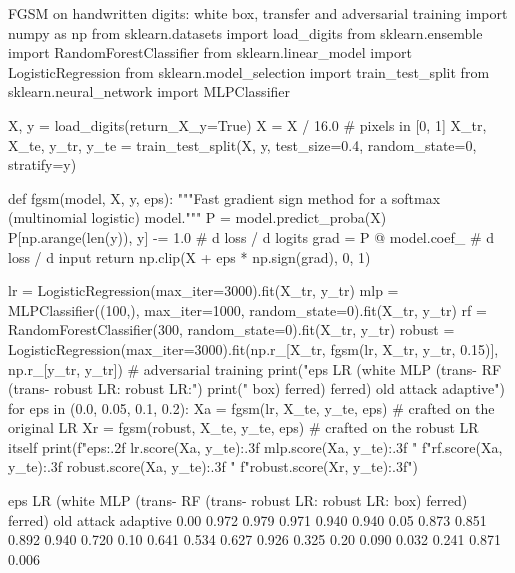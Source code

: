 \begin{pylisting}[label={lst:fgsm}]{FGSM on handwritten digits: white box, transfer and adversarial training}
import numpy as np
from sklearn.datasets import load_digits
from sklearn.ensemble import RandomForestClassifier
from sklearn.linear_model import LogisticRegression
from sklearn.model_selection import train_test_split
from sklearn.neural_network import MLPClassifier

X, y = load_digits(return_X_y=True)
X = X / 16.0                                                    # pixels in [0, 1]
X_tr, X_te, y_tr, y_te = train_test_split(X, y, test_size=0.4, random_state=0, stratify=y)

def fgsm(model, X, y, eps):
    """Fast gradient sign method for a softmax (multinomial logistic) model."""
    P = model.predict_proba(X)
    P[np.arange(len(y)), y] -= 1.0                              # d loss / d logits
    grad = P @ model.coef_                                       # d loss / d input
    return np.clip(X + eps * np.sign(grad), 0, 1)

lr = LogisticRegression(max_iter=3000).fit(X_tr, y_tr)
mlp = MLPClassifier((100,), max_iter=1000, random_state=0).fit(X_tr, y_tr)
rf = RandomForestClassifier(300, random_state=0).fit(X_tr, y_tr)
robust = LogisticRegression(max_iter=3000).fit(np.r_[X_tr, fgsm(lr, X_tr, y_tr, 0.15)],
                                               np.r_[y_tr, y_tr])    # adversarial training
print("eps   LR (white  MLP (trans-  RF (trans-  robust LR:   robust LR:")
print("      box)       ferred)      ferred)     old attack   adaptive")
for eps in (0.0, 0.05, 0.1, 0.2):
    Xa = fgsm(lr, X_te, y_te, eps)                   # crafted on the original LR
    Xr = fgsm(robust, X_te, y_te, eps)               # crafted on the robust LR itself
    print(f"{eps:.2f}  {lr.score(Xa, y_te):.3f}      {mlp.score(Xa, y_te):.3f}        "
          f"{rf.score(Xa, y_te):.3f}       {robust.score(Xa, y_te):.3f}        "
          f"{robust.score(Xr, y_te):.3f}")
\end{pylisting}
\begin{pyoutput}
eps   LR (white  MLP (trans-  RF (trans-  robust LR:   robust LR:
      box)       ferred)      ferred)     old attack   adaptive
0.00  0.972      0.979        0.971       0.940        0.940
0.05  0.873      0.851        0.892       0.940        0.720
0.10  0.641      0.534        0.627       0.926        0.325
0.20  0.090      0.032        0.241       0.871        0.006
\end{pyoutput}

